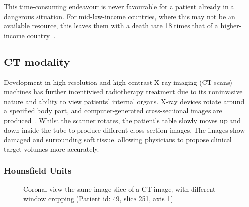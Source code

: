 \documentclass[12pt,twoside]{report}
\begin{document}
This time-consuming endeavour is never favourable for a patient already in a dangerous situation. For mid-low-income countries, where this may not be an available resource, this leaves them with a death rate 18 times that of a higher-income country~\cite{cervical-cancer-epidemic}. 

\subsection{CT modality}

Development in high-resolution and high-contrast X-ray imaging (CT scans) machines has further incentivised radiotherapy treatment due to its noninvasive nature and ability to view patients' internal organs. X-ray devices rotate around a specified body part, and computer-generated cross-sectional images are produced~\cite{file-formats}. Whilst the scanner rotates, the patient's table slowly moves up and down inside the tube to produce different cross-section images. The images show damaged and surrounding soft tissue, allowing physicians to propose clinical target volumes more accurately.

\subsubsection{Hounsfield Units}

\begin{figure}[H]
    \centering
    \caption{Coronal view the same image slice of a CT image, with different window cropping (Patient id: 49, slice 251, axis 1)}
    \label{fig:ct-windows}
\end{figure}
\end{document}
